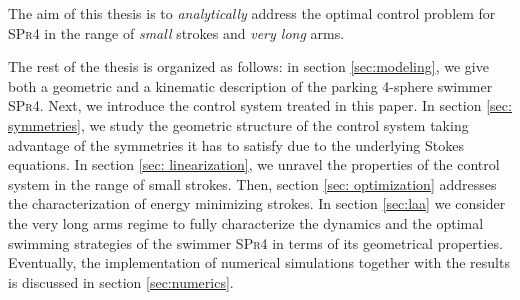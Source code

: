 The aim of this thesis is to \emph{analytically} address the optimal control problem for \textsc{SPr4} in the range of \emph{small} strokes and \emph{very long} arms.

The rest of the thesis is organized as follows: in section \ref{sec:modeling}, we give both a geometric and a kinematic description of the parking 4-sphere swimmer \textsc{SPr4}. Next, we introduce the control system treated in this paper. In section \ref{sec: symmetries}, we study the geometric structure of the control system taking advantage of the symmetries it has to satisfy due to the underlying Stokes  equations. In section \ref{sec: linearization}, we unravel the properties of the control system in the range of small strokes. Then, section \ref{sec: optimization} addresses the characterization of energy minimizing strokes. In section \ref{sec:laa} we consider the very long arms regime to fully characterize the dynamics and the optimal swimming strategies of the swimmer \textsc{SPr4} in terms of its geometrical properties. Eventually, the implementation of numerical simulations together with the results is discussed in section \ref{sec:numerics}.




